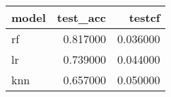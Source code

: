 \begin{tabular}{lrr}
\toprule
model & test_acc & testcf \\
\midrule
rf & 0.817000 & 0.036000 \\
lr & 0.739000 & 0.044000 \\
knn & 0.657000 & 0.050000 \\
\bottomrule
\end{tabular}
